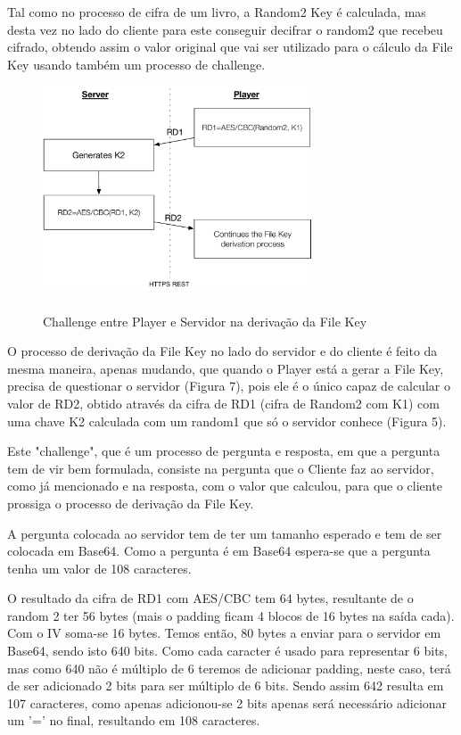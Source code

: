 \documentclass[pdftex,12pt,a4paper]{report}
\begin{document}
Tal como no processo de cifra de um livro, a Random2 Key é calculada, mas desta vez no lado do cliente para este conseguir decifrar o random2 que recebeu cifrado, obtendo assim o valor original que vai ser utilizado para o cálculo da File Key usando também um processo de challenge.

\begin{figure}[!htb]
\center
 \includegraphics[width=80mm,scale=1]{challengefilekey.pdf}
 \caption{\\Challenge entre Player e Servidor na derivação da File Key}
 \label{fig:eer}
\end{figure}

O processo de derivação da File Key no lado do servidor e do cliente é feito da mesma maneira, apenas mudando, que quando o Player está a gerar a File Key, precisa de questionar o servidor (Figura 7), pois ele é o único capaz de calcular o valor de RD2, obtido através da cifra de RD1 (cifra de Random2 com K1) com uma chave K2 calculada com um random1 que só o servidor conhece (Figura 5). 

Este "challenge", que é um processo de pergunta e resposta, em que a pergunta tem de vir bem formulada, consiste na pergunta que o Cliente faz ao servidor, como já mencionado e na resposta, com o valor que calculou, para que o cliente prossiga o processo de derivação da File Key. 

A pergunta colocada ao servidor tem de ter um tamanho esperado e tem de ser colocada em Base64. Como a pergunta é em Base64 espera-se que a pergunta tenha um valor de 108 caracteres. 

O resultado da cifra de RD1 com AES/CBC tem 64 bytes, resultante de o random 2 ter 56 bytes (mais o padding ficam 4 blocos de 16 bytes na saída cada). Com o IV soma-se 16 bytes. Temos então, 80 bytes a enviar para o servidor em Base64, sendo isto 640 bits. Como cada caracter é usado para representar 6 bits, mas como 640 não é múltiplo de 6 teremos de adicionar padding, neste caso, terá de ser adicionado 2 bits para ser múltiplo de 6 bits. Sendo assim 642 resulta em 107 caracteres, como apenas adicionou-se 2 bits apenas será necessário adicionar um '=' no final, resultando em 108 caracteres.
\end{document}
